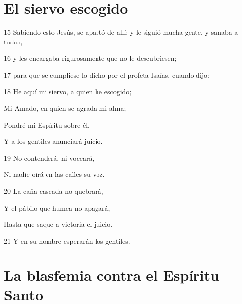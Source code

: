 \section*{El siervo escogido}

\par 15 Sabiendo esto Jesús, se apartó de allí; y le siguió mucha gente, y sanaba a todos,
\par 16 y les encargaba rigurosamente que no le descubriesen;
\par 17 para que se cumpliese lo dicho por el profeta Isaías, cuando dijo:
\par 18 He aquí mi siervo, a quien he escogido;
\par Mi Amado, en quien se agrada mi alma;
\par Pondré mi Espíritu sobre él,
\par Y a los gentiles anunciará juicio.
\par 19 No contenderá, ni voceará,
\par Ni nadie oirá en las calles su voz.
\par 20 La caña cascada no quebrará,
\par Y el pábilo que humea no apagará,
\par Hasta que saque a victoria el juicio.
\par 21 Y en su nombre esperarán los gentiles.

\section*{La blasfemia contra el Espíritu Santo}

